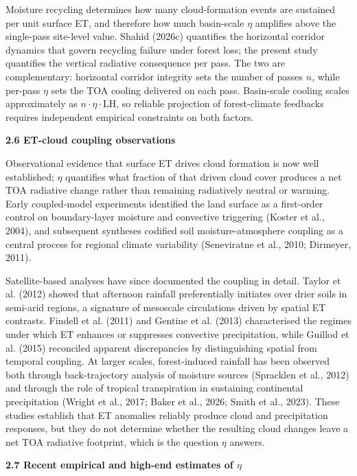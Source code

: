 Moisture recycling determines how many cloud-formation events are sustained per unit surface ET, and therefore how much basin-scale $\eta$ amplifies above the single-pass site-level value. Shahid (2026c) quantifies the horizontal corridor dynamics that govern recycling failure under forest loss; the present study quantifies the vertical radiative consequence per pass. The two are complementary: horizontal corridor integrity sets the number of passes $n$, while per-pass $\eta$ sets the TOA cooling delivered on each pass. Basin-scale cooling scales approximately as $n \cdot \eta \cdot \mathrm{LH}$, so reliable projection of forest-climate feedbacks requires independent empirical constraints on both factors.

\textbf{2.6 ET-cloud coupling observations}

Observational evidence that surface ET drives cloud formation is now well established; $\eta$ quantifies what fraction of that driven cloud cover produces a net TOA radiative change rather than remaining radiatively neutral or warming. Early coupled-model experiments identified the land surface as a first-order control on boundary-layer moisture and convective triggering (Koster et al., 2004), and subsequent syntheses codified soil moisture-atmosphere coupling as a central process for regional climate variability (Seneviratne et al., 2010; Dirmeyer, 2011).

Satellite-based analyses have since documented the coupling in detail. Taylor et al. (2012) showed that afternoon rainfall preferentially initiates over drier soils in semi-arid regions, a signature of mesoscale circulations driven by spatial ET contrasts. Findell et al. (2011) and Gentine et al. (2013) characterised the regimes under which ET enhances or suppresses convective precipitation, while Guillod et al. (2015) reconciled apparent discrepancies by distinguishing spatial from temporal coupling. At larger scales, forest-induced rainfall has been observed both through back-trajectory analysis of moisture sources (Spracklen et al., 2012) and through the role of tropical transpiration in sustaining continental precipitation (Wright et al., 2017; Baker et al., 2026; Smith et al., 2023). These studies establish that ET anomalies reliably produce cloud and precipitation responses, but they do not determine whether the resulting cloud changes leave a net TOA radiative footprint, which is the question $\eta$ answers.

\bigskip

\textbf{2.7 Recent empirical and high-end estimates of $\eta$}

